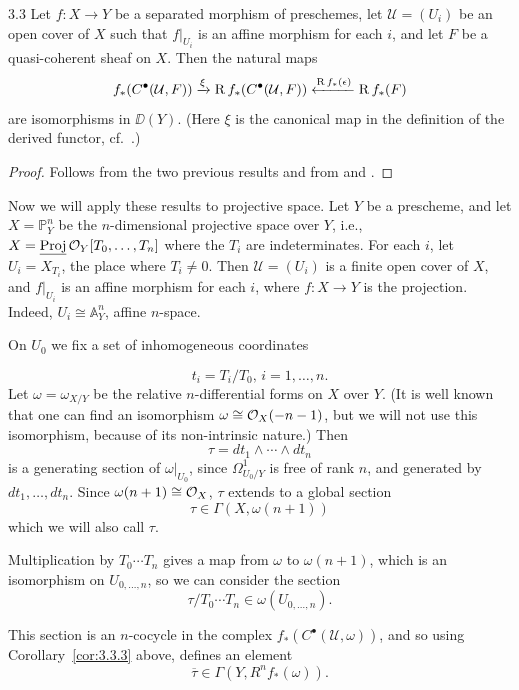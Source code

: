 \begin{bookcorollary}{3.3}\label{cor:3.3.3}
Let $f\colon X\to Y$ be a separated morphism of preschemes, let $\mathcal{U}=(U_i)$ be an open cover of $X$ such that $f|_{U_i}$ is an affine morphism for each $i$, and let $F$ be a quasi-coherent sheaf on $X$. Then the natural maps
\[
f_*(C^\bullet(\mathcal{U},F)) \xrightarrow{\xi} \operatorname{R} f_*(C^\bullet(\mathcal{U},F)) \xleftarrow{\operatorname{R} f_*(\epsilon)} \operatorname{R} f_*(F)
\]
are isomorphisms in $\DD(Y)$. (Here $\xi$ is the canonical map in the definition of the derived functor, cf.\ .)
\end{bookcorollary}

\begin{proof}
Follows from the two previous results and from  and .
\end{proof}

Now we will apply these results to projective space. Let $Y$ be a prescheme, and let $X=\mathbb{P}^n_Y$ be the $n$-dimensional projective space over $Y$, i.e., $X=\underline{\operatorname{Proj}}\,\mathcal{O}_Y[T_0,\dots,T_n]$ where the $T_i$ are indeterminates. For each $i$, let $U_i=X_{T_i}$, the place where $T_i\neq 0$. Then $\mathcal{U}=(U_i)$ is a finite open cover of $X$, and $f|_{U_i}$ is an affine morphism for each $i$, where $f\colon X\to Y$ is the projection. Indeed, $U_i\cong\mathbb{A}^n_Y$, affine $n$-space.

On $U_0$ we fix a set of inhomogeneous coordinates

\[t_i=T_i/T_0,\, i=1,\dots,n.
\]
Let $\omega=\omega_{X/Y}$ be the relative $n$-differential forms on $X$ over $Y$. (It is well known that one can find an isomorphism $\omega\cong\mathcal{O}_X(-n-1)$, but we will not use this isomorphism, because of its non-intrinsic nature.) Then
\[
\tau = dt_1\wedge\cdots\wedge dt_n
\]
is a generating section of $\omega|_{U_0}$, since $\Omega^1_{U_0/Y}$ is free of rank $n$, and generated by $dt_1,\dots,dt_n$. Since $\omega(n+1)\cong\mathcal{O}_X$, $\tau$ extends to a global section
\[
\tau \in \Gamma(X,\omega(n+1))
\]
which we will also call $\tau$.

Multiplication by $T_0\cdots T_n$ gives a map from $\omega$ to $\omega(n+1)$, which is an isomorphism on $U_{0,\dots,n}$, so we can consider the section
\[
\tau/T_0\cdots T_n \in \omega(U_{0,\dots,n}).
\]

This section is an $n$-cocycle in the complex $f_*(C^\bullet(\mathcal{U},\omega))$, and so using Corollary~\ref{cor:3.3.3} above, defines an element
\[
\overline{\tau} \in \Gamma(Y,R^n f_*(\omega)).
\]

